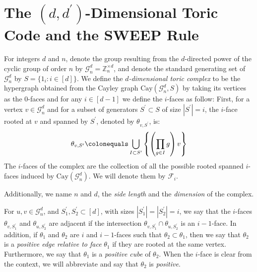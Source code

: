 


\section{The $(d,d^{\prime})$-Dimensional Toric Code and the SWEEP Rule}

\begin{definition} 
  \label{def:toric_complex}
  For integers $d$ and $n$, denote the group resulting from the $d$-directed power of the cyclic group of order $n$ by $\mathcal{G}_{n}^{d} = \mathbb{Z}_{n}^{\times d}$, and denote the standard generating set of $\mathcal{G}_{n}^{d}$ by $S = \{ 1_{i} \colon i \in [d] \}$. We define the \textit{$d$-dimensional toric complex} to be the hypergraph obtained from the Cayley graph $\text{Cay}(\mathcal{G}_{n}^{d}, S)$ by taking its vertices as the $0$-faces and for any $i \in [d-1]$ we define the $i$-faces as follow: First, for a vertex $v \in \mathcal{G}_{n}^{d}$ and for a subset of generators $S^{\prime} \subset S$ of size $|S^{\prime}| = i$, the $i$-face rooted at $v$ and spanned by $S^{\prime}$, denoted by $\theta_{v, S^{\prime}}$, is:
  \begin{equation*}
    \begin{split}
      \theta_{v,S^{\prime}} \colonequals \bigcup_{I \subset S^{\prime}} \left\{  \left(\prod_{g \in I} g \right) v  \right\}
    \end{split}
  \end{equation*}
  The $i$-faces of the complex are the collection of all the possible rooted spanned $i$-faces induced by $\text{Cay}(\mathcal{G}_{n}^{d})$. We will denote them by $\mathcal{F}_{i}$. 

  Additionally, we name $n$ and $d$, the \textit{side length} and the \textit{dimension} of the complex.  
\end{definition}
\begin{definition}
  For $u,v \in \mathcal{G}_{n}^{d}$, and $S^{\prime}_{1},S^{\prime}_{2} \subset [d]$, with sizes $|S^{\prime}_{1}| = |S^{\prime}_{2}| = i$, we say that the $i$-faces $\theta_{v,S^{\prime}_{1}}$ and $\theta_{u,S^{\prime}_{2}}$ are adjacent if the intersection $\theta_{v,S^{\prime}_{1}} \cap \theta_{u,S^{\prime}_{2}}$ is an $i-1$-face. In addition, if $\theta_{1}$ and $\theta_{2}$ are $i$ and $i-1$-faces such that $\theta_{2} \subset \theta_{1}$, then we say that $\theta_{2}$ is a \textit{positive edge relative to face} $\theta_{1}$ if they are rooted at the same vertex. Furthermore, we say that $\theta_{1}$ is a \textit{positive cube} of $\theta_{2}$. When the $i$-face is clear from the context, we will abbreviate and say that $\theta_{2}$ is \textit{positive}.
\end{definition}
